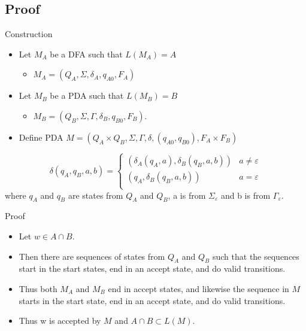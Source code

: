 \documentclass{beamer}
\begin{document}
\subsection{Proof}
\begin{frame}{Construction}
    \begin{itemize}
    \item Let $M_A$ be a DFA such that $L(M_A) = A$
        \begin{itemize}
            \item $M_A = (Q_A, \Sigma, \delta_A, q_{A0}, F_A)$
        \end{itemize}
    \item Let $M_B$ be a PDA such that $L(M_B) = B$\\
        \begin{itemize}
            \item $M_B = (Q_B, \Sigma, \Gamma, \delta_B, q_{B0}, F_B)$.
        \end{itemize}

    \item Define PDA $M = (Q_A\times Q_B, \Sigma, \Gamma, \delta, (q_{A0}, q_{B0}), F_A\times F_B)$
    \end{itemize}
    
    \[
        \delta(q_A, q_B, a, b)=\left\{
        \begin{array}{ll}
            (\delta_A(q_A, a), \delta_B(q_B, a, b)) & a\ne \varepsilon\\
            (q_A, \delta_B(q_B, a, b))  & a=\varepsilon\\
        \end{array}
        \right.
    \]
    where $q_A$ and $q_B$ are states from $Q_A$ and $Q_B$, a is from $\Sigma_\varepsilon$ and b is from $\Gamma_\varepsilon$.
\end{frame}

\begin{frame}{Proof}
    \begin{itemize}
        \item Let $w\in A\cap B$. \\

        \item Then there are sequences of states from $Q_A$ and $Q_B$ such that the sequences start in the start states, 
        end in an accept state, and do valid transitions.

        \item Thus both $M_A$ and $M_B$ end in accept states, and likewise the sequence in $M$ starts in the start state,  
        end in an accept state, and do valid transitions. 

        \item Thus w is accepted by $M$ and $A\cap B\subset L(M)$.
    \end{itemize}
\end{frame}
\end{document}
